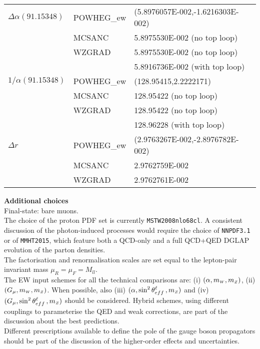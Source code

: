 \begin{tabular}{lll}
  $ \Delta \alpha (91.15348)$
  & POWHEG\_ew
  &  $\!\!\!$(5.8976057E-002,-1.6216303E-002) \\
  &  MCSANC
  &  5.8975530E-002 (no top loop) \\
  &  WZGRAD
  &  5.8975530E-002 (no top loop) \\
  &
  &  5.8916736E-002 (with top loop) \\
  $1/\alpha(91.15348)$
  & POWHEG\_ew
  & $\!\!\!$(128.95415,2.2222171) \\
  & MCSANC
  & 128.95422 (no top loop)       \\
  & WZGRAD
  & 128.95422 (no top loop)  \\
  &
  & 128.96228 (with top loop) \\
  $\Delta r$
  &  POWHEG\_ew
  &  $\!\!\!$(2.9763267E-002,-2.8976782E-002) \\
  & MCSANC
  & 2.9762759E-002\\                                                   
  & WZGRAD
  & 2.9762761E-002
\end{tabular}

\vskip0.5cm



{\bf Additional choices}\\
Final-state: bare muons.\\
The choice of the proton PDF set is currently {\tt MSTW2008nlo68cl}.
A consistent discussion of the photon-induced processes would require the choice
of {\tt NNPDF3.1} or of {\tt MMHT2015}, which feature both a QCD-only and a full QCD+QED DGLAP evolution of the parton densities.\\
The factorisation and renormalisation scales are set equal to the lepton-pair
invariant mass $\mu_R=\mu_F=M_{ll}$.\\
The EW input schemes for all the technical comparisons are:
(i) $(\alpha,m_{\scriptscriptstyle W},m_{\scriptscriptstyle Z})$, (ii) $(G_\mu,m_{\scriptscriptstyle W},m_{\scriptscriptstyle Z})$.
When possible,
also (iii) $(\alpha,\sin^2\theta_{eff}^{\ell}\,,m_{\scriptscriptstyle Z})$ and (iv) $(G_\mu,\sin^2\theta_{eff}^{\ell}\,,m_{\scriptscriptstyle Z})$
should be considered.
Hybrid schemes, using different couplings
to parameterise the QED and weak corrections,
are part of the discussion about the best predictions.\\
Different prescriptions available to define
the pole of the gauge boson propagators
should be part of the discussion of the higher-order effects and uncertainties.\\[3mm]



